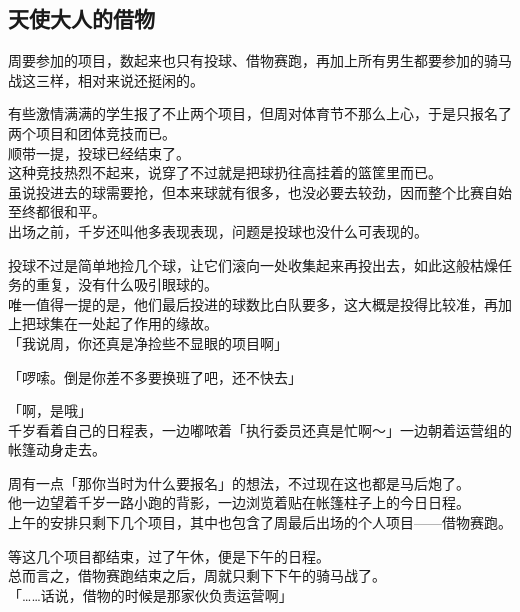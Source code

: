 \subsection{天使大人的借物}

周要参加的项目，数起来也只有投球、借物赛跑，再加上所有男生都要参加的骑马战这三样，相对来说还挺闲的。

有些激情满满的学生报了不止两个项目，但周对体育节不那么上心，于是只报名了两个项目和团体竞技而已。\\

顺带一提，投球已经结束了。\\

这种竞技热烈不起来，说穿了不过就是把球扔往高挂着的篮筐里而已。\\

虽说投进去的球需要抢，但本来球就有很多，也没必要去较劲，因而整个比赛自始至终都很和平。\\

出场之前，千岁还叫他多表现表现，问题是投球也没什么可表现的。

投球不过是简单地捡几个球，让它们滚向一处收集起来再投出去，如此这般枯燥任务的重复，没有什么吸引眼球的。\\

唯一值得一提的是，他们最后投进的球数比白队要多，这大概是投得比较准，再加上把球集在一处起了作用的缘故。\\

「我说周，你还真是净捡些不显眼的项目啊」

「啰嗦。倒是你差不多要换班了吧，还不快去」

「啊，是哦」\\

千岁看着自己的日程表，一边嘟哝着「执行委员还真是忙啊～」一边朝着运营组的帐篷动身走去。

周有一点「那你当时为什么要报名」的想法，不过现在这也都是马后炮了。\\

他一边望着千岁一路小跑的背影，一边浏览着贴在帐篷柱子上的今日日程。\\

上午的安排只剩下几个项目，其中也包含了周最后出场的个人项目——借物赛跑。

等这几个项目都结束，过了午休，便是下午的日程。\\

总而言之，借物赛跑结束之后，周就只剩下下午的骑马战了。\\

「……话说，借物的时候是那家伙负责运营啊」\\

